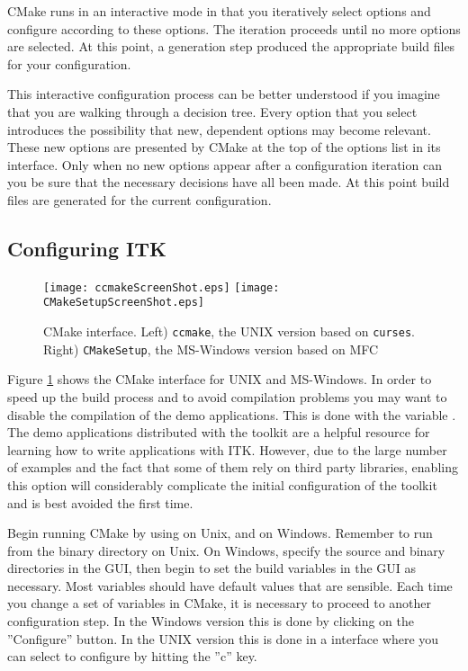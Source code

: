 CMake runs in an interactive mode in that you iteratively select options and
configure according to these options. The iteration proceeds until no more
options are selected. At this point, a generation step produced the appropriate
build files for your configuration.

This interactive configuration process can be better understood if you
imagine that you are walking through a decision tree.  Every option that you
select introduces the possibility that new, dependent options may become
relevant. These new options are presented by CMake at the top of the options
list in its interface.  Only when no new options appear after a configuration
iteration can you be sure that the necessary decisions have all been made. At
this point build files are generated for the current configuration.

\subsection{Configuring ITK}
\label{sec:ConfiguringITKwithVTK}
  

\begin{figure}[ht]
\centering 
\texttt{[image: ccmakeScreenShot.eps]}
\texttt{[image: CMakeSetupScreenShot.eps]}
\caption[Cmake user interface]{CMake interface. Left) \texttt{ccmake}, the UNIX
version based on \texttt{curses}. Right) \texttt{CMakeSetup}, the MS-Windows
version based on MFC}
\label{fig:CMakeGUI}
\end{figure}

Figure \ref{fig:CMakeGUI} shows the CMake interface for UNIX and MS-Windows.
In order to speed up the build process and to avoid compilation problems you
may want to disable the compilation of the demo applications. This is done
with the variable
. The demo applications  distributed with the
toolkit are a helpful resource for learning how to write applications with
ITK.  However, due to the large number of examples and the fact that some of
them rely on third party libraries, enabling this option will considerably
complicate the initial configuration of the toolkit and is best avoided the
first time.

Begin running CMake by using  on Unix, and  on
Windows. Remember to run  from the binary directory on Unix. On
Windows, specify the source and binary directories in the GUI, then begin to
set the build variables in the GUI as necessary.  Most variables should have
default values that are sensible. Each time you change a set of variables in
CMake, it is necessary to proceed to another configuration step. In the
Windows version this is done by clicking on the ''Configure'' button. In the
UNIX version this is done in a
 interface where you can select to configure by hitting the
''c'' key.


